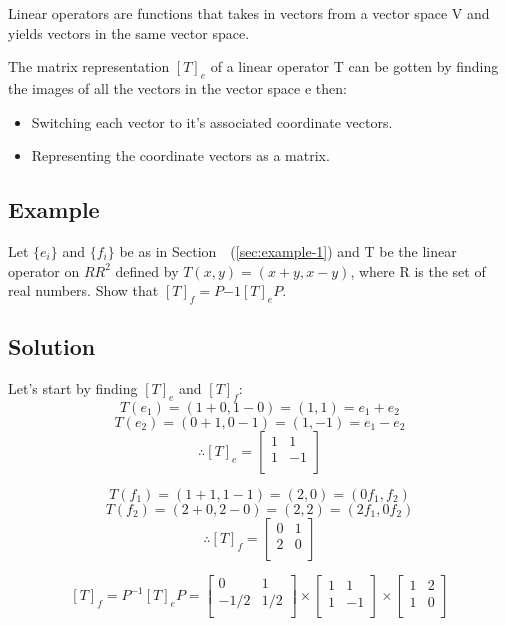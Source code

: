 \documentclass{book}
\begin{document}
Linear operators are functions that takes in vectors from a vector space V and yields vectors in the same vector space.

The matrix representation \({[T]}_e\) of a linear operator T can be gotten by finding the images of all the vectors in the vector space e then:

\begin{itemize}
	\item Switching each vector to it's associated coordinate vectors.
	\item Representing the coordinate vectors as a matrix.
\end{itemize}

\subsection{Example}

Let \(\{e_i\}\) and \(\{f_i\}\) be as in Section~~(\ref{sec:example-1}) and T be the linear operator on \(RR^2\) defined by \(T(x, y) = (x + y, x - y)\), where R is the set of real numbers. Show that \({[T]}_f = P{−1} {[T]}_e P\).

\subsection*{Solution}

Let's start by finding \({[T]}_e\) and \({[T]}_f\):
\[T(e_1) = (1 + 0, 1 - 0) = (1, 1) = e_1 + e_2\]
\[T(e_2) = (0 + 1, 0 - 1) = (1, -1) = e_1 - e_2\]
\[\therefore {[T]}_e = \begin{bmatrix}
	1 & 1 \\
	1 & -1 \\
\end{bmatrix}\]

\[T(f_1) = (1 + 1, 1 - 1) = (2, 0) = (0f_1, f_2)\]
\[T(f_2) = (2 + 0, 2 - 0) = (2, 2) = (2f_1, 0f_2)\]
\[\therefore {[T]}_f = \begin{bmatrix}
	0 & 1 \\
	2 & 0 \\
\end{bmatrix}\]

\[{[T]}_f = P^{-1} {[T]}_e P = \begin{bmatrix}
	0 & 1 \\
	-1/2 & 1/2 \\
\end{bmatrix}
\times
\begin{bmatrix}
	1 & 1 \\
	1 & -1 \\
\end{bmatrix}
\times
\begin{bmatrix}
	1 & 2 \\
	1 & 0 \\
\end{bmatrix}\]
\end{document}
